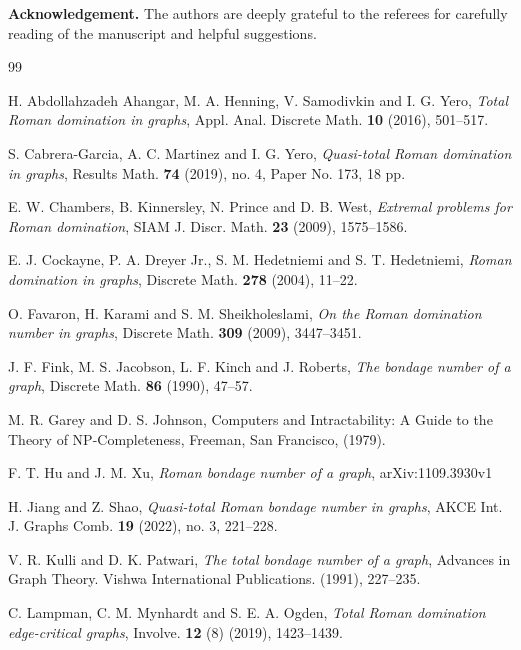 \documentclass[12pt,reqno]{amsart}
\theoremstyle{plain}
\numberwithin{equation}{section}
\begin{document}
{\bf Acknowledgement.}
The authors are deeply grateful to the
referees for carefully reading of the manuscript and helpful
suggestions. 



\begin{thebibliography}{99}

 H. Abdollahzadeh Ahangar, M. A. Henning, V. Samodivkin and I. G. Yero, \emph{Total Roman domination in graphs}, Appl. Anal. Discrete Math. \textbf{10} (2016), 501--517.

 S. Cabrera-Garcia, A. C. Martinez and I. G. Yero, \emph{Quasi-total Roman domination in graphs}, Results Math. \textbf{74} (2019), no. 4, Paper No. 173, 18 pp.

 E. W. Chambers, B. Kinnersley, N. Prince and D. B. West, \emph{Extremal problems for Roman domination}, SIAM J. Discr. Math. \textbf{23} (2009), 1575--1586.

 E. J. Cockayne, P. A. Dreyer Jr., S. M. Hedetniemi and S. T. Hedetniemi, \emph{Roman domination in graphs}, Discrete Math. \textbf{278} (2004), 11--22.

 O. Favaron, H. Karami and S. M. Sheikholeslami, \emph{On the
Roman domination number in graphs}, Discrete Math. \textbf{309} (2009), 3447--3451.

 J. F. Fink, M. S. Jacobson, L. F. Kinch and J. Roberts, \emph{The
bondage number of a graph}, Discrete Math. \textbf{86}  (1990), 47--57.

 M. R. Garey and D. S. Johnson, Computers and Intractability: A
Guide to the Theory of NP-Completeness, Freeman, San Francisco, (1979).

 F. T. Hu and J. M. Xu, \emph{Roman bondage number of a graph}, arXiv:1109.3930v1

 H. Jiang and Z. Shao, \emph{Quasi-total Roman bondage number in graphs}, AKCE Int. J. Graphs Comb. \textbf{19} (2022), no. 3, 221--228.

 V. R. Kulli and D. K. Patwari, \emph{The total bondage number of
a graph}, Advances in Graph Theory. Vishwa International Publications.
(1991), 227--235.

 C. Lampman, C. M. Mynhardt and S. E. A. Ogden, \emph{Total Roman domination
edge-critical graphs}, Involve. \textbf{12} (8) (2019), 1423--1439.


\end{thebibliography}
\end{document}
